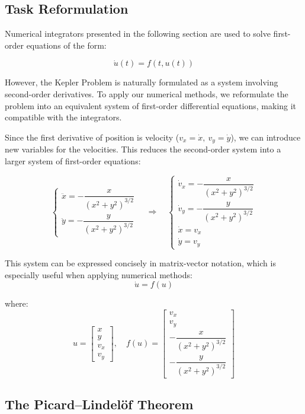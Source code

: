 \documentclass[11pt]{article}
\begin{document}
\subsection{Task Reformulation}
Numerical integrators presented in the following section are used to solve first-order equations of the form:

\[
\dot{u}(t) = f(t, u(t))
\]

However, the Kepler Problem is naturally formulated as a system involving second-order derivatives. To apply our numerical methods, we reformulate the problem into an equivalent system of first-order differential equations, making it compatible with the integrators.

Since the first derivative of position is velocity ($ v_x = \dot{x}, \ v_y = \dot{y} $), we can introduce new variables for the velocities. This reduces the second-order system into a larger system of first-order equations:

\[
\begin{cases}
\ddot{x} = -\dfrac{x}{(x^2 + y^2)^{3/2}} \\[10pt]
\ddot{y} = -\dfrac{y}{(x^2 + y^2)^{3/2}}
\end{cases}
\quad \Rightarrow \quad
\begin{cases}
\dot{v}_x = -\dfrac{x}{(x^2 + y^2)^{3/2}} \\[10pt]
\dot{v}_y = -\dfrac{y}{(x^2 + y^2)^{3/2}} \\[10pt]
\dot{x} = v_x \\[10pt]
\dot{y} = v_y
\end{cases}
\]

This system can be expressed concisely in matrix-vector notation, which is especially useful when applying numerical methods:
\[
\dot {u} = f(u)
\]

where:
\[
u =
\begin{bmatrix}
x \\[5pt]
y \\[5pt]
v_x \\[5pt]
v_y
\end{bmatrix}, \quad
f(u) =
\begin{bmatrix}
v_x \\[5pt]
v_y \\[5pt]
-\dfrac{x}{(x^2 + y^2)^{3/2}} \\[5pt]
-\dfrac{y}{(x^2 + y^2)^{3/2}}
\end{bmatrix}
\]



\subsection{The Picard–Lindelöf Theorem}
\end{document}
